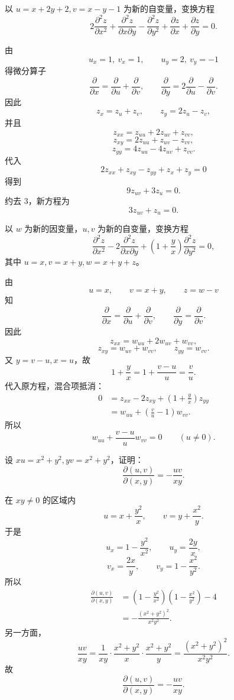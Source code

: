 \begin{xexercise}[8]
以 $u=x+2y+2,v=x-y-1$ 为新的自变量，变换方程
  \[
    2\frac{\partial^2z}{\partial x^2}
    +\frac{\partial^2z}{\partial x\partial y}
    -\frac{\partial^2z}{\partial y^2}
    +\frac{\partial z}{\partial x}
    +\frac{\partial z}{\partial y}=0.
  \]
\end{xexercise}
\begin{xsolution}
由
\[
  u_x=1,\ v_x=1,
  \qquad
  u_y=2,\ v_y=-1
\]
得微分算子
\[
  \frac\partial{\partial x}=\frac\partial{\partial u}+\frac\partial{\partial v},
  \qquad
  \frac\partial{\partial y}=2\frac\partial{\partial u}-\frac\partial{\partial v}.
\]
因此
\[
  z_x=z_u+z_v,
  \qquad z_y=2z_u-z_v,
\]
并且
\[
  z_{xx}=z_{uu}+2z_{uv}+z_{vv},
\]
\[
  z_{xy}=2z_{uu}+z_{uv}-z_{vv},
\]
\[
  z_{yy}=4z_{uu}-4z_{uv}+z_{vv}.
\]
代入
\[
  2z_{xx}+z_{xy}-z_{yy}+z_x+z_y=0
\]
得到
\[
  9z_{uv}+3z_u=0.
\]
约去 $3$，新方程为
\[
  \boxed{\displaystyle 3z_{uv}+z_u=0}.
\]
\end{xsolution}


\begin{xexercise}[9]
以 $w$ 为新的因变量，$u,v$ 为新的自变量，变换方程
  \[
    \frac{\partial^2z}{\partial x^2}
    -2\frac{\partial^2z}{\partial x\partial y}
    +\left(1+\frac yx\right)\frac{\partial^2z}{\partial y^2}=0,
  \]
  其中 $u=x,v=x+y,w=x+y+z$。
\end{xexercise}
\begin{xsolution}
由
\[
  u=x,\qquad v=x+y,\qquad z=w-v
\]
知
\[
  \frac\partial{\partial x}=\frac\partial{\partial u}+\frac\partial{\partial v},
  \qquad
  \frac\partial{\partial y}=\frac\partial{\partial v}.
\]
因此
\[
  z_{xx}=w_{uu}+2w_{uv}+w_{vv},
\]
\[
  z_{xy}=w_{uv}+w_{vv},
  \qquad
  z_{yy}=w_{vv}.
\]
又 $y=v-u,x=u$，故
\[
  1+\frac yx=1+\frac{v-u}{u}=\frac vu.
\]
代入原方程，混合项抵消：
\begin{align*}
  0&=z_{xx}-2z_{xy}+\left(1+\frac yx\right)z_{yy}\\
   &=w_{uu}+\left(\frac vu-1\right)w_{vv}.
\end{align*}
所以
\[
  \boxed{\displaystyle
    w_{uu}+\frac{v-u}{u}w_{vv}=0}
  \qquad(u\ne0).
\]
\end{xsolution}


\begin{xexercise}[10]
设 $xu=x^2+y^2,yv=x^2+y^2$，证明：
  \[
    \frac{\partial(u,v)}{\partial(x,y)}=-\frac{uv}{xy}.
  \]
\end{xexercise}
\begin{xsolution}
在 $xy\ne0$ 的区域内
\[
  u=x+\frac{y^2}{x},
  \qquad
  v=y+\frac{x^2}{y}.
\]
于是
\[
  u_x=1-\frac{y^2}{x^2},
  \qquad u_y=\frac{2y}{x},
\]
\[
  v_x=\frac{2x}{y},
  \qquad v_y=1-\frac{x^2}{y^2}.
\]
所以
\begin{align*}
  \frac{\partial(u,v)}{\partial(x,y)}
  &=\left(1-\frac{y^2}{x^2}\right)
    \left(1-\frac{x^2}{y^2}\right)-4\\
  &=-\frac{(x^2+y^2)^2}{x^2y^2}.
\end{align*}
另一方面，
\[
  \frac{uv}{xy}
  =\frac1{xy}\cdot\frac{x^2+y^2}{x}
                  \cdot\frac{x^2+y^2}{y}
  =\frac{(x^2+y^2)^2}{x^2y^2}.
\]
故
\[
  \boxed{\displaystyle
    \frac{\partial(u,v)}{\partial(x,y)}=-\frac{uv}{xy}}.
\]
\end{xsolution}


